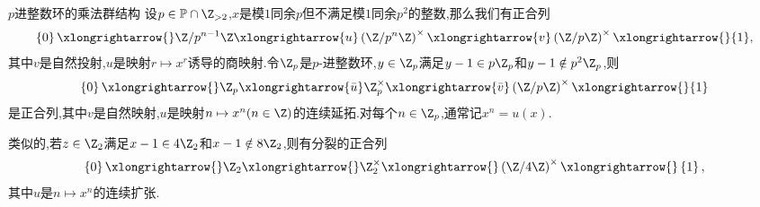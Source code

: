 \begin{remark}{$p$进整数环的乘法群结构}{}
	设$p\in\mathbb{P}\cap\Z_{>2}$,$x$是模$1$同余$p$但不满足模$1$同余$p^{2}$的整数,那么我们有正合列
	\begin{align*}
		\left\{0\right\}\xlongrightarrow{}\Z/p^{n-1}\Z\xlongrightarrow{u}\left(\Z/p^{n}\Z\right)^{\times}\xlongrightarrow{v}\left(\Z/p\Z\right)^{\times}\xlongrightarrow{}{1},
	\end{align*}
	其中$v$是自然投射,$u$是映射$r\mapsto x^{r}$诱导的商映射.令$\Z_{p}$是$p$-进整数环,$y\in\Z_{p}$满足$y-1\in p\Z_{p}$和$y-1\notin p^{2}\Z_{p}$,则
	\begin{align*}
		\left\{0\right\}\xlongrightarrow{}\Z_{p}\xlongrightarrow{\bar{u}}\Z_{p}^{\times}\xlongrightarrow{\bar{v}}\left(\Z/p\Z\right)^{\times}\xlongrightarrow{}{1}
	\end{align*}
	是正合列,其中$v$是自然映射,$u$是映射$n\mapsto x^{n}(n\in\Z)$的连续延拓.对每个$n\in\Z_{p}$,通常记$x^{n}=u\left(x\right)$.
	
	类似的,若$z\in\Z_{2}$满足$x-1\in 4\Z_{2}$和$x-1\notin 8\Z_{2}$,则有分裂的正合列
	\begin{align*}
		\left\{0\right\}\xlongrightarrow{}\Z_{2}\xlongrightarrow{}\Z_{2}^{\times}\xlongrightarrow{}\left(\Z/4\Z\right)^{\times}\xlongrightarrow{}\left\{1\right\},
	\end{align*}
	其中$u$是$n\mapsto x^{n}$的连续扩张.
\end{remark}

































































































